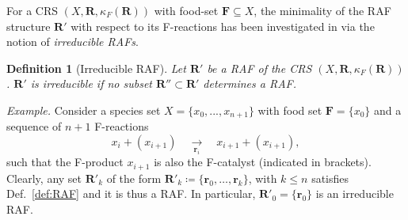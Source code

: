 \documentclass[pdflatex]{sn-jnl}
\theoremstyle{thmstyleone}%
\theoremstyle{examplesty}%
\theoremstyle{thmstylethree}%
\newtheorem{definition}[theorem]{Definition}%
\newcommand{\food}{\ensuremath{\mathbf{F}}}
\newcommand{\FR}[0]{\mathbf{R}}
\newcommand{\fr}[0]{\mathbf{r}}
\newcommand{\RAF}[0]{\mathbf{R}'}
\newcommand{\cat}{\kappa_F}
\begin{document}
For a CRS $(X,\FR,\cat(\FR))$ with food-set $\food\subseteq X$, 
the minimality of the RAF structure $\RAF$ with respect to its F-reactions 
has been investigated in \cite{steel_minimal_2013} via the 
notion of \emph{irreducible RAFs}.

\vspace{3mm}
\begin{definition}[Irreducible RAF]\label{def:irrerRAF}
  Let $\RAF$ be a RAF of the CRS $(X,\FR,\cat(\FR))$. $\RAF$ is
  \emph{irreducible} if no subset $\RAF'\subset \RAF$ determines a RAF.
\end{definition}

\emph{Example.} Consider a species set $X=\{x_0,...,x_{n+1}\}$ with food 
set $\food=\{x_0\}$ and a sequence of $n+1$ F-reactions
\begin{equation}\label{eq:ExReacSeq}
x_i + (x_{i+1})\quad\underset{\fr_i}\longrightarrow\quad x_{i+1}+(x_{i+1}),
\end{equation}
such that the F-product $x_{i+1}$ is also the F-catalyst (indicated in
brackets).  Clearly, any set $\RAF_k$ of the form
$\RAF_k\coloneqq \{\fr_0,\ldots, \fr_k\}$, with $k\leq n$ satisfies
Def.~\ref{def:RAF} and it is thus a RAF. In particular, $\RAF_0=\{\fr_0\}$
is an irreducible RAF.
\end{document}
